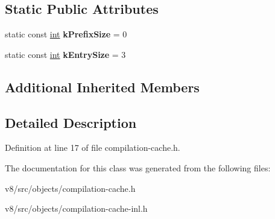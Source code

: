 \subsection*{Static Public Attributes}
\begin{DoxyCompactItemize}
\item 
\mbox{\label{classv8_1_1internal_1_1CompilationCacheShape_a2854205f345fada271ceb5dcc695cd05}} 
static const \mbox{\hyperlink{classint}{int}} {\bfseries k\+Prefix\+Size} = 0
\item 
\mbox{\label{classv8_1_1internal_1_1CompilationCacheShape_a9644cdffa86339e9b0e5694affd27a3b}} 
static const \mbox{\hyperlink{classint}{int}} {\bfseries k\+Entry\+Size} = 3
\end{DoxyCompactItemize}
\subsection*{Additional Inherited Members}


\subsection{Detailed Description}


Definition at line 17 of file compilation-\/cache.\+h.



The documentation for this class was generated from the following files\+:\begin{DoxyCompactItemize}
\item 
v8/src/objects/compilation-\/cache.\+h\item 
v8/src/objects/compilation-\/cache-\/inl.\+h\end{DoxyCompactItemize}
